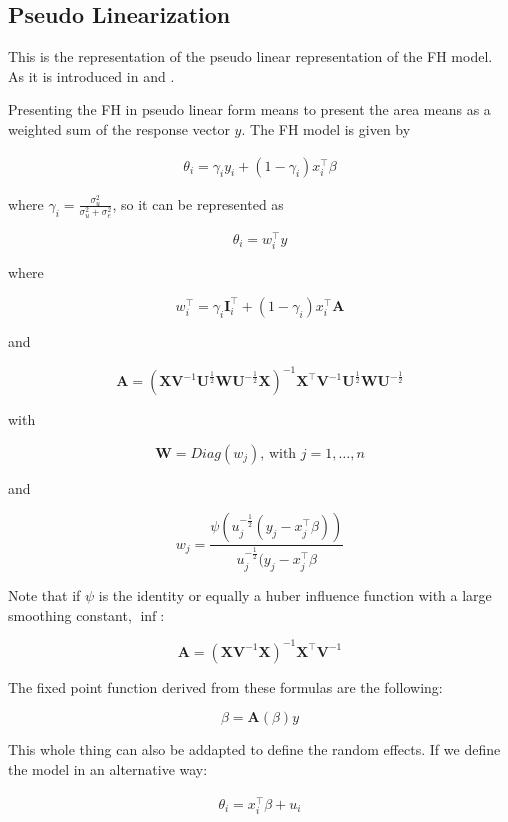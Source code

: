 \subsection{Pseudo Linearization}\label{pseudo-linearization}

This is the representation of the pseudo linear representation of the FH
model. As it is introduced in \textcite{Cha11} and \textcite{Cha14}.

Presenting the FH in pseudo linear form means to present the area means
as a weighted sum of the response vector $y$. The FH model is given by

\begin{align}
\theta_i = \gamma_i y_i + (1 - \gamma_i) x_i^\top \beta 
\end{align}

where $\gamma_i = \frac{\sigma^2_u}{\sigma^2_u + \sigma^2_e}$, so it can
be represented as

\[
\theta_i = w_i^\top y
\]

where

\[
w_i^\top = \gamma_i \mathbf{I}^\top_i + (1 - \gamma_i) x_i^\top \mathbf{A}
\]

and

\[
\mathbf{A} = \left(\mathbf{X} \mathbf{V}^{-1} \mathbf{U}^\frac{1}{2} \mathbf{W} \mathbf{U}^{-\frac{1}{2}} \mathbf{X} \right)^{-1} \mathbf{X}^\top \mathbf{V}^{-1} \mathbf{U}^\frac{1}{2} \mathbf{W} \mathbf{U}^{-\frac{1}{2}}
\]

with

\[
\mathbf{W} = Diag(w_j)\text{, with } j = 1, \dots, n
\]

and

\[
w_j = \frac{\psi\left( u_j^{-\frac{1}{2}} ( y_j - x_j^\top\beta ) \right)}{ u_j^{-\frac{1}{2}} ( y_j - x_j^\top\beta }
\]

Note that if $\psi$ is the identity or equally a huber influence
function with a large smoothing constant, \ie $\inf$:

\[
\mathbf{A} = \left(\mathbf{X} \mathbf{V}^{-1} \mathbf{X} \right)^{-1} \mathbf{X}^\top \mathbf{V}^{-1}
\]

The fixed point function derived from these formulas are the following:

\[
\beta = \mathbf{A}(\beta) y
\]

This whole thing can also be addapted to define the random effects. If
we define the model in an alternative way:

\begin{align}
\theta_i = x_i^\top \beta + u_i
\end{align}

